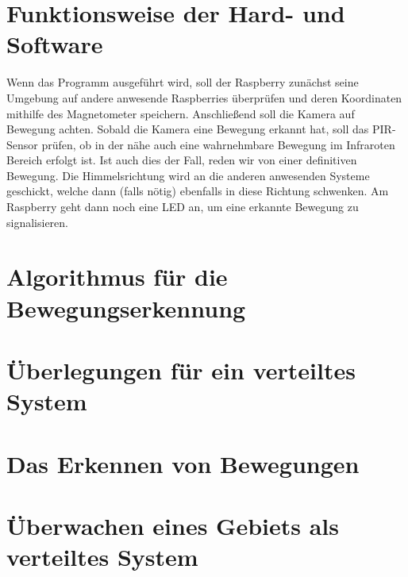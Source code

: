 \documentclass[journal, compsoc ]{IEEEtran}
\begin{document}
\section{Funktionsweise der Hard- und Software}
Wenn das Programm ausgeführt wird, soll der Raspberry zunächst seine Umgebung auf andere anwesende Raspberries überprüfen und deren Koordinaten mithilfe des Magnetometer speichern. 
Anschließend soll die Kamera auf Bewegung achten. 
Sobald die Kamera eine Bewegung erkannt hat, soll das PIR-Sensor prüfen, ob in der nähe auch eine wahrnehmbare Bewegung im Infraroten Bereich erfolgt ist. 
Ist auch dies der Fall, reden wir von einer definitiven Bewegung. 
Die Himmelsrichtung wird an die anderen anwesenden Systeme geschickt, welche dann (falls nötig) ebenfalls in diese Richtung schwenken. 
Am Raspberry geht dann noch eine LED an, um eine erkannte Bewegung zu signalisieren. 

\section{Algorithmus für die Bewegungserkennung}


\section{Überlegungen für ein verteiltes System}



\section{Das Erkennen von Bewegungen}


\section{Überwachen eines Gebiets als verteiltes System}


\printbibliography
\end{document}
